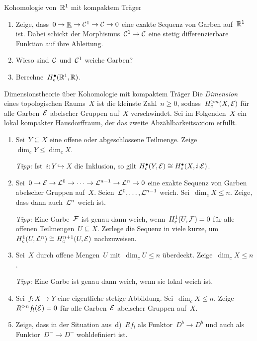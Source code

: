 \documentclass{uebblatt}
\begin{document}

\begin{aufgabe}{Kohomologie von~$\mathbb{R}^1$ mit kompaktem Träger}
\begin{enumerate}
\item Zeige, dass~$0 \to \underline{\mathbb{R}} \to \mathcal{C}^1 \to
\mathcal{C} \to 0$ eine exakte Sequenz von Garben auf~$\mathbb{R}^1$ ist. Dabei schickt der Morphismus~$\mathcal{C}^1
\to \mathcal{C}$ eine stetig differenzierbare Funktion auf ihre Ableitung.
\item Wieso sind~$\mathcal{C}$ und~$\mathcal{C}^1$ weiche Garben?
\item Berechne~$H^\bullet_c(\mathbb{R}^1, \mathbb{R})$.
\end{enumerate}
\end{aufgabe}

\begin{aufgabe}{Dimensionstheorie über Kohomologie mit kompaktem Träger}
Die \emph{Dimension} eines topologischen Raums~$X$ ist die kleinste Zahl~$n
\geq 0$, sodass~$H_c^{> n}(X,\mathcal{E})$ für alle Garben~$\mathcal{E}$ abelscher Gruppen
auf~$X$ verschwindet. Sei im Folgenden~$X$ ein lokal kompakter Hausdorffraum,
der das zweite Abzählbarkeitsaxiom erfüllt.
\begin{enumerate}
\item Sei~$Y \subseteq X$ eine offene oder abgeschlossene Teilmenge.
Zeige~$\dim_c Y \leq \dim_c X$.

{\tiny\emph{Tipp:} Ist~$i : Y \hookrightarrow X$ die Inklusion, so gilt
$H_c^\bullet(Y,\mathcal{E}) \cong H_c^\bullet(X,i_! \mathcal{E})$.\par}
\item Sei~$0 \to \mathcal{E} \to \mathcal{L}^0 \to \cdots \to \mathcal{L}^{n-1} \to \mathcal{L}^n \to 0$ eine
exakte Sequenz von Garben abelscher Gruppen auf~$X$.
Seien~$\mathcal{L}^0,\ldots,\mathcal{L}^{n-1}$ weich. Sei~$\dim_c X \leq n$. Zeige, dass dann
auch~$\mathcal{L}^n$ weich ist.

{\tiny\emph{Tipp:} Eine Garbe~$\mathcal{F}$ ist genau dann weich, wenn~$H^1_c(U,\mathcal{F}) = 0$
für alle offenen Teilmengen~$U \subseteq X$. Zerlege die Sequenz in viele
kurze, um~$H^1_c(U,\mathcal{L}^n) \cong H^{n+1}_c(U,\mathcal{E})$ nachzuweisen.\par}
\item Sei~$X$ durch offene Mengen~$U$ mit~$\dim_c U \leq
n$ überdeckt. Zeige~$\dim_c X \leq n$.

{\tiny\emph{Tipp:} Eine Garbe ist genau dann weich, wenn sie lokal weich
ist.\par}
\item Sei~$f : X \to Y$ eine eigentliche stetige Abbildung. Sei~$\dim_c X \leq n$.
Zeige~$R^{> n} f_!(\mathcal{E}) = 0$ für alle Garben~$\mathcal{E}$ abelscher Gruppen auf~$X$.
\item Zeige, dass in der Situation aus~d)~$Rf_!$ als Funktor~$D^b \to D^b$ und
auch als Funktor~$D^- \to D^-$ wohldefiniert ist.
\end{enumerate}
\end{aufgabe}
\end{document}
